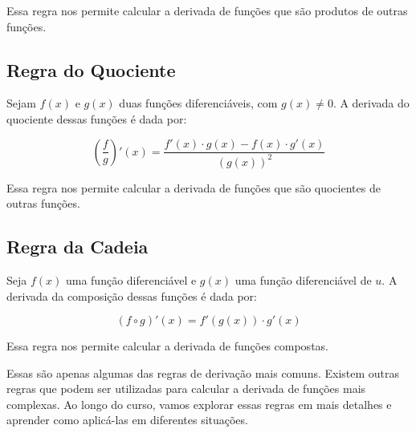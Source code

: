 \documentclass[12pt]{article}
\begin{document}
Essa regra nos permite calcular a derivada de funções que são produtos de outras funções.

\subsection{Regra do Quociente}

Sejam $f(x)$ e $g(x)$ duas funções diferenciáveis, com $g(x) \neq 0$. A derivada do quociente dessas funções é dada por:

\[
\left(\frac{f}{g}\right)'(x) = \frac{f'(x) \cdot g(x) - f(x) \cdot g'(x)}{(g(x))^2}
\]

Essa regra nos permite calcular a derivada de funções que são quocientes de outras funções.

\subsection{Regra da Cadeia}

Seja $f(x)$ uma função diferenciável e $g(x)$ uma função diferenciável de $u$. A derivada da composição dessas funções é dada por:

\[
(f \circ g)'(x) = f'(g(x)) \cdot g'(x)
\]

Essa regra nos permite calcular a derivada de funções compostas.

Essas são apenas algumas das regras de derivação mais comuns. Existem outras regras que podem ser utilizadas para calcular a derivada de funções mais complexas. Ao longo do curso, vamos explorar essas regras em mais detalhes e aprender como aplicá-las em diferentes situações.
\end{document}
